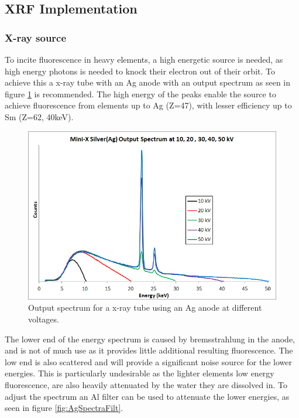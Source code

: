 \subsection{XRF Implementation}

\subsubsection{X-ray source}
To incite fluorescence in heavy elements, a high energetic source is needed, as high energy photons is needed to knock their electron out of their orbit. To achieve this a x-ray tube with an Ag anode with an output spectrum as seen in figure \ref{fig:AgSpectra} is recommended. The high energy of the peaks enable the source to achieve fluorescence from elements up to Ag (Z=47), with lesser efficiency up to Sm (Z=62, 40keV).

\begin{figure}[h]
	\centering
	\includegraphics[width=\textwidth]{figures/XRF/minix50_ag6.png}
	\caption{Output spectrum for a x-ray tube using an Ag anode at different voltages.\citep{AmptekSource}}
	\label{fig:AgSpectra}
\end{figure}

The lower end of the energy spectrum is caused by bremsstrahlung in the anode, and is not of much use as it provides little additional resulting fluorescence. The low end is also scattered and will provide a significant noise source for the lower energies. This is particularly undesirable as the lighter elements low energy fluorescence, are also heavily attenuated by the water they are dissolved in. To adjust the spectrum an Al filter can be used to attenuate the lower energies, as seen in figure \ref{fig:AgSpectraFilt}.

